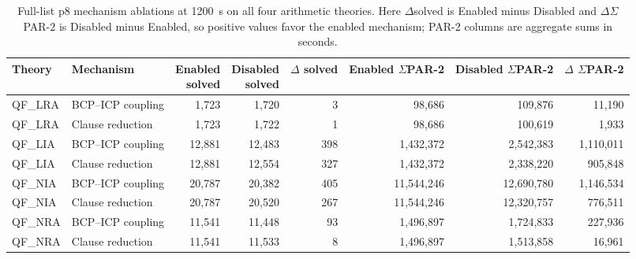 \begin{table}[htbp]
\centering
\caption{Full-list p8 mechanism ablations at 1200~s on all four arithmetic theories.
Here $\Delta$solved is Enabled minus Disabled and $\Delta\Sigma$PAR-2 is Disabled minus Enabled, so positive values favor the enabled mechanism; PAR-2 columns are aggregate sums in seconds.}
\label{tab:ablation-full-list}
\footnotesize
\setlength{\tabcolsep}{1.8pt}
\begin{tabular}{@{}llrrrrrr@{}}
\toprule
Theory & Mechanism & \shortstack{Enabled\\solved} & \shortstack{Disabled\\solved} & $\Delta$ solved & \shortstack{Enabled\\$\Sigma$PAR-2} & \shortstack{Disabled\\$\Sigma$PAR-2} & \shortstack{$\Delta$\\$\Sigma$PAR-2} \\
\midrule
QF\_LRA & BCP--ICP coupling & 1,723 & 1,720 & 3 & 98,686 & 109,876 & 11,190 \\
QF\_LRA & Clause reduction & 1,723 & 1,722 & 1 & 98,686 & 100,619 & 1,933 \\
\midrule
QF\_LIA & BCP--ICP coupling & 12,881 & 12,483 & 398 & 1,432,372 & 2,542,383 & 1,110,011 \\
QF\_LIA & Clause reduction & 12,881 & 12,554 & 327 & 1,432,372 & 2,338,220 & 905,848 \\
\midrule
QF\_NIA & BCP--ICP coupling & 20,787 & 20,382 & 405 & 11,544,246 & 12,690,780 & 1,146,534 \\
QF\_NIA & Clause reduction & 20,787 & 20,520 & 267 & 11,544,246 & 12,320,757 & 776,511 \\
\midrule
QF\_NRA & BCP--ICP coupling & 11,541 & 11,448 & 93 & 1,496,897 & 1,724,833 & 227,936 \\
QF\_NRA & Clause reduction & 11,541 & 11,533 & 8 & 1,496,897 & 1,513,858 & 16,961 \\
\bottomrule
\end{tabular}
\end{table}
